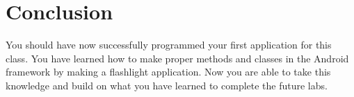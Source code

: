 \section{Conclusion}

You should have now successfully programmed your first application for this class.
You have learned how to make proper methods and classes in the Android framework by making a flashlight application.
Now you are able to take this knowledge and build on what you have learned to complete the future labs.

